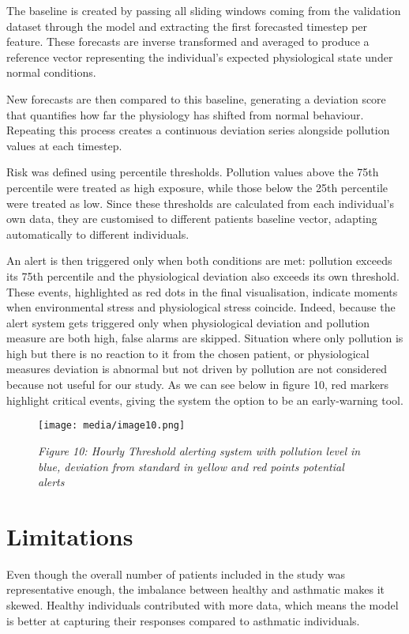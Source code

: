 \documentclass[12pt,a4paper]{report}
\begin{document}
The baseline is created by passing all sliding windows coming from the
validation dataset through the model and extracting the first forecasted
timestep per feature. These forecasts are inverse transformed and
averaged to produce a reference vector representing the individual's
expected physiological state under normal conditions.

New forecasts are then compared to this baseline, generating a deviation
score that quantifies how far the physiology has shifted from normal
behaviour. Repeating this process creates a continuous deviation series
alongside pollution values at each timestep.

Risk was defined using percentile thresholds. Pollution values above the
75th percentile were treated as high exposure, while those below the
25th percentile were treated as low. Since these thresholds are
calculated from each individual's own data, they are customised to
different patients baseline vector, adapting automatically to different
individuals.

An alert is then triggered only when both conditions are met: pollution
exceeds its 75th percentile and the physiological deviation also exceeds
its own threshold. These events, highlighted as red dots in the final
visualisation, indicate moments when environmental stress and
physiological stress coincide. Indeed, because the alert system gets
triggered only when physiological deviation and pollution measure are
both high, false alarms are skipped. Situation where only pollution is
high but there is no reaction to it from the chosen patient, or
physiological measures deviation is abnormal but not driven by pollution
are not considered because not useful for our study. As we can see below
in figure 10, red markers highlight critical events, giving the system
the option to be an early-warning tool.


\begin{figure}[h!]
    \centering
    \texttt{[image: media/image10.png]}
    \caption*{\emph{Figure 10: Hourly Threshold alerting system with pollution level
in blue, deviation from standard in yellow and red points potential
alerts}}

\end{figure}




\chapter{Limitations}
Even though the overall number of patients included in the study was
representative enough, the imbalance between healthy and asthmatic makes
it skewed. Healthy individuals contributed with more data, which means
the model is better at capturing their responses compared to asthmatic
individuals.
\end{document}
